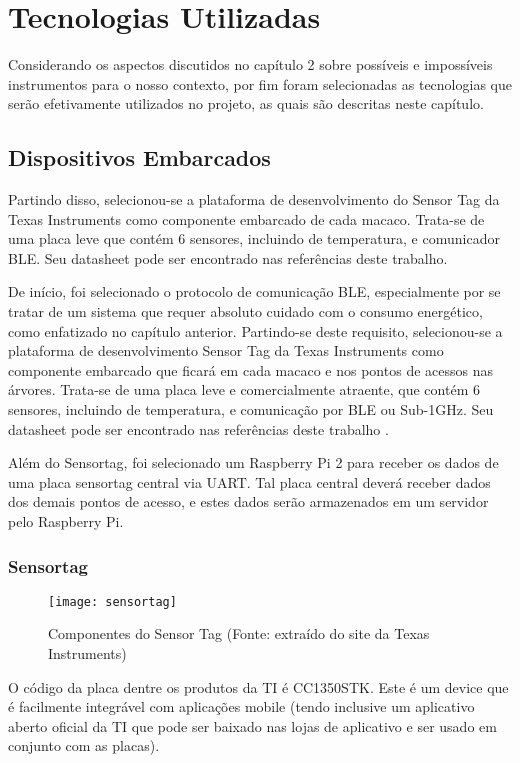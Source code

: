 \chapter{Tecnologias Utilizadas}
Considerando os aspectos discutidos no capítulo 2 sobre possíveis e impossíveis instrumentos para o nosso contexto, por fim foram selecionadas as tecnologias que serão efetivamente utilizados no projeto, as quais são descritas neste capítulo.

\section{Dispositivos Embarcados}
Partindo disso, selecionou-se a plataforma de desenvolvimento do Sensor Tag da Texas Instruments como componente embarcado de cada macaco. Trata-se de uma placa leve que contém 6 sensores, incluindo de temperatura, e comunicador BLE. Seu datasheet pode ser encontrado nas referências deste trabalho.

De início, foi selecionado o protocolo de comunicação BLE, especialmente por se tratar de um sistema que requer absoluto cuidado com o consumo energético, como enfatizado no capítulo anterior.
Partindo-se deste requisito, selecionou-se a plataforma de desenvolvimento Sensor Tag da Texas Instruments como componente embarcado que ficará em cada macaco e nos pontos de acessos nas árvores. Trata-se de uma placa leve e comercialmente atraente, que contém 6 sensores, incluindo de temperatura, e comunicação por BLE ou Sub-1GHz. Seu datasheet pode ser encontrado nas referências deste trabalho \cite{datasheet}.

Além do Sensortag, foi selecionado um Raspberry Pi 2 para receber os dados de uma placa sensortag central via UART. Tal placa central deverá receber dados dos demais pontos de acesso, e estes dados serão armazenados em um servidor pelo Raspberry Pi.

\subsection{Sensortag}

\begin{figure}[ht]
  \centering
    \texttt{[image: sensortag]}
  \caption{Componentes do Sensor Tag (Fonte: extraído do site da Texas Instruments)}
\end{figure}

O código da placa dentre os produtos da TI é CC1350STK. Este é um device que é facilmente integrável com aplicações mobile (tendo inclusive um aplicativo aberto oficial da TI que pode ser baixado nas lojas de aplicativo e ser usado em conjunto com as placas).\\


